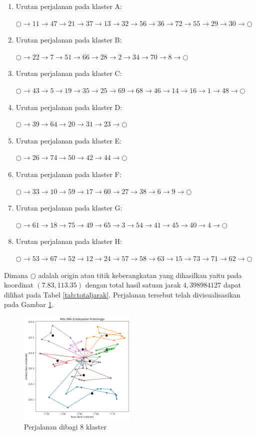 \begin{enumerate}
\item Urutan perjalanan pada klaster A:

$\bigcirc \to 11 \to 47 \to 21 \to 37 \to 13 \to 32 \to 56 \to 36 \to 72 \to 55 \to 29 \to 30 \to \bigcirc$

\item Urutan perjalanan pada klaster B:

$\bigcirc \to 22 \to 7 \to 51 \to 66 \to 28 \to 2 \to 34 \to 70 \to 8 \to \bigcirc$

\item Urutan perjalanan pada klaster C:

$\bigcirc \to 43 \to 5 \to 19 \to 35 \to 25 \to 69 \to 68 \to 46 \to 14 \to 16 \to 1 \to 48 \to \bigcirc$

\item Urutan perjalanan pada klaster D:

$\bigcirc \to 39 \to 64 \to 20 \to 31 \to 23 \to \bigcirc$

\item Urutan perjalanan pada klaster E:

$\bigcirc \to 26 \to 74 \to 50 \to 42 \to 44 \to \bigcirc$

\item Urutan perjalanan pada klaster F:

$\bigcirc \to 33 \to 10 \to 59 \to 17 \to 60 \to 27 \to 38 \to 6 \to 9 \to \bigcirc$

\item Urutan perjalanan pada klaster G:

$\bigcirc \to 61 \to 18 \to 75 \to 49 \to 65 \to 3 \to 54 \to 41 \to 45 \to 40 \to 4 \to \bigcirc$

\item Urutan perjalanan pada klaster H:

$\bigcirc \to 53 \to 67 \to 52 \to 12 \to 24 \to 57 \to 58 \to 63 \to 15 \to 73 \to 71 \to 62 \to \bigcirc$
\end{enumerate}

Dimana $\bigcirc$ adalah origin atau titik keberangkatan yang dihasilkan yaitu pada koordinat $(7.83, 113.35)$ dengan total hasil satuan jarak $4,398984127$ dapat dilihat pada Tabel \ref{tab:totaljarak}. Perjalanan tersebut telah divisualisasikan pada Gambar \ref{fig:hasil_mtsp8}.

\begin{figure}[H]
\centering
\includegraphics[width=0.5\textwidth]{Gambar/hasil_mtsp/8}
\caption{Perjalanan dibagi 8 klaster}
\label{fig:hasil_mtsp8}
\end{figure}

